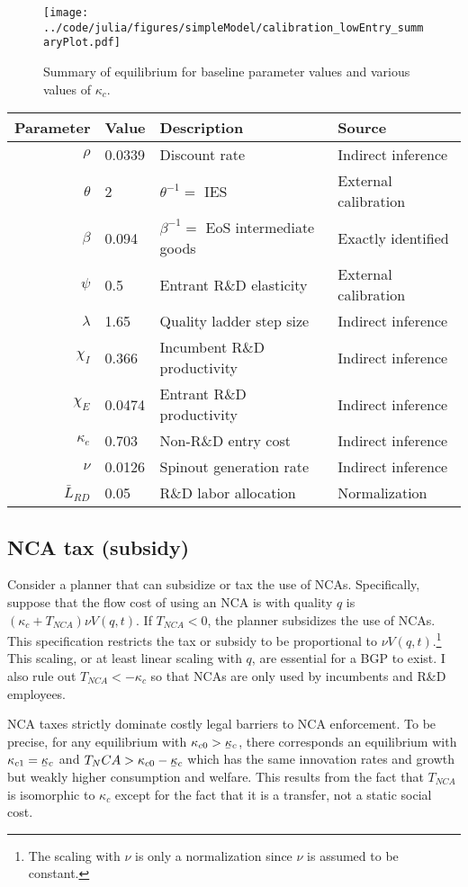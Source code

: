 \documentclass[11pt,english]{article}
\newcommand\munderbar[1]{%
	\underaccent{\bar}{#1}}
\theoremstyle{remark}
\begin{document}
\begin{figure}[]
	\texttt{[image: ../code/julia/figures/simpleModel/calibration\_lowEntry\_summaryPlot.pdf]}
	\caption{Summary of equilibrium for baseline parameter values and various values of $\kappa_c$.}
	\label{calibration_lowEntry_summaryPlot}
\end{figure}

\begin{table}[]
	\centering
	\label{calibration_lowEntry_parameters}
	\begin{tabular}{rlll}
		\toprule \toprule
		Parameter & Value & Description & Source \tabularnewline
		\midrule
		$\rho$ & 0.0339 & Discount rate  & Indirect inference \tabularnewline
		$\theta$ & 2 & $\theta^{-1} = $ IES & External calibration 
		\tabularnewline
		$\beta$ & 0.094 & $\beta^{-1} = $ EoS intermediate goods & Exactly identified \tabularnewline 
		$\psi$ & 0.5 & Entrant R\&D elasticity & External calibration \tabularnewline
		$\lambda$ & 1.65 & Quality ladder step size & Indirect inference 
		\tabularnewline
		$\chi_I$ & 0.366 & Incumbent R\&D productivity & Indirect inference 
		\tabularnewline
		$\chi_E$ & 0.0474 & Entrant R\&D productivity & Indirect inference \tabularnewline 
		$\kappa_e$ & 0.703 & Non-R\&D entry cost & Indirect inference \tabularnewline
		$\nu$ & 0.0126 & Spinout generation rate  & Indirect inference\tabularnewline
		$\bar{L}_{RD}$ & 0.05 & R\&D labor allocation  & Normalization \tabularnewline
		\bottomrule
	\end{tabular}
\end{table}

\subsection{NCA tax (subsidy)}

Consider a planner that can subsidize or tax the use of NCAs. Specifically, suppose that the flow cost of using an NCA is with quality $q$ is $(\kappa_c + T_{NCA})\nu  V(q,t)$. If $T_{NCA} < 0$, the planner subsidizes the use of NCAs. This specification restricts the tax or subsidy to be proportional to $\nu V(q,t)$.\footnote{The scaling with $\nu$ is only a normalization since $\nu$ is assumed to be constant.} This scaling, or at least linear scaling with $q$, are essential for a BGP to exist. I also rule out $T_{NCA} < -\kappa_c$ so that NCAs are only used by incumbents and R\&D employees.

NCA taxes strictly dominate costly legal barriers to NCA enforcement. To be precise, for any equilibrium with $\kappa_{c0} > \munderbar{\kappa}_c$, there corresponds an equilibrium with $\kappa_{c1} = \munderbar{\kappa}_c$ and $T_NCA > \kappa_{c0} - \munderbar{\kappa}_c$ which has the same innovation rates and growth but weakly higher consumption and welfare. This results from the fact that $T_{NCA}$ is isomorphic to $\kappa_c$ except for the fact that it is a transfer, not a static social cost. 
\end{document}
